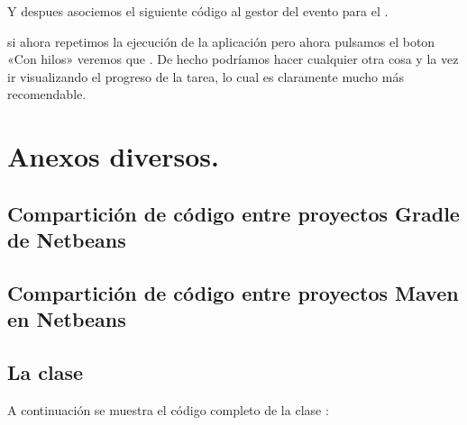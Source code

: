 \documentclass[letterpaper,10pt,spanish]{sphinxmanual}
\begin{document}
Y despues asociemos el siguiente código al gestor del evento  para el .

\begin{sphinxVerbatim}[commandchars=\\\{\}]
    
        
\end{sphinxVerbatim}

si ahora repetimos la ejecución de la aplicación pero ahora pulsamos el boton «Con hilos» veremos que  . De hecho podríamos hacer cualquier otra cosa y la vez ir visualizando el progreso de la tarea, lo cual es claramente mucho más recomendable.


\chapter{Anexos diversos.}
\label{\detokenize{textos/anexos:anexos-diversos}}\label{\detokenize{textos/anexos::doc}}

\section{Compartición de código entre proyectos Gradle de Netbeans}
\label{\detokenize{textos/anexos:comparticion-de-codigo-entre-proyectos-gradle-de-netbeans}}

\section{Compartición de código entre proyectos Maven en Netbeans}
\label{\detokenize{textos/anexos:comparticion-de-codigo-entre-proyectos-maven-en-netbeans}}

\section{La clase }
\label{\detokenize{textos/anexos:la-clase-utilidadesficheros}}
A continuación se muestra el código completo de la clase :
\end{document}
